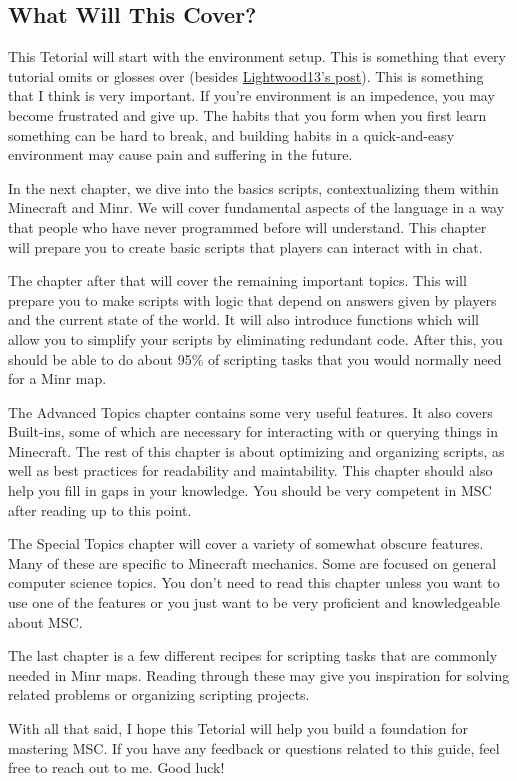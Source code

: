 \documentclass[oneside]{book}
\begin{document}
\begin{preface}
\section*{What Will This Cover?}
This Tetorial will start with the environment setup. This is something that every tutorial omits or glosses over (besides \href{https://forums.minr.org/threads/visual-studio-code-extension-for-minr-scripts.6175/}{Lightwood13's post}). This is something that I think is very important. If you're environment is an impedence, you may become frustrated and give up. The habits that you form when you first learn something can be hard to break, and building habits in a quick-and-easy environment may cause pain and suffering in the future.

In the next chapter, we dive into the basics scripts, contextualizing them within Minecraft and Minr. We will cover fundamental aspects of the language in a way that people who have never programmed before will understand. This chapter will prepare you to create basic scripts that players can interact with in chat.

The chapter after that will cover the remaining important topics. This will prepare you to make scripts with logic that depend on answers given by players and the current state of the world. It will also introduce functions which will allow you to simplify your scripts by eliminating redundant code. After this, you should be able to do about 95\% of scripting tasks that you would normally need for a Minr map.

The Advanced Topics chapter contains some very useful features. It also covers Built-ins, some of which are necessary for interacting with or querying things in Minecraft. The rest of this chapter is about optimizing and organizing scripts, as well as best practices for readability and maintability. This chapter should also help you fill in gaps in your knowledge. You should be very competent in MSC after reading up to this point.

The Special Topics chapter will cover a variety of somewhat obscure features. Many of these are specific to Minecraft mechanics. Some are focused on general computer science topics. You don't need to read this chapter unless you want to use one of the features or you just want to be very proficient and knowledgeable about MSC.

The last chapter is a few different recipes for scripting tasks that are commonly needed in Minr maps. Reading through these may give you inspiration for solving related problems or organizing scripting projects.

With all that said, I hope this Tetorial will help you build a foundation for mastering MSC. If you have any feedback or questions related to this guide, feel free to reach out to me. Good luck!

\end{preface}
\end{document}
